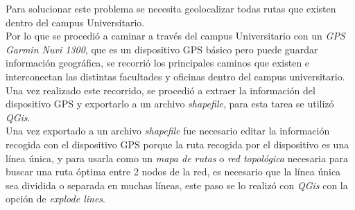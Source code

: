 Para solucionar este problema se necesita geolocalizar todas rutas que existen dentro del campus Universitario. \\


%
%


Por lo que se procedió a caminar a través del campus Universitario con un \emph{GPS Garmin Nuvi 1300}, que es un dispositivo GPS básico pero puede guardar información geográfica,  se recorrió los principales caminos que existen e interconectan las distintas facultades y oficinas dentro del campus universitario. Una vez realizado este recorrido, se procedió a extraer la información del dispositivo GPS y exportarlo a un archivo \emph{shapefile}, para esta tarea se utilizó \emph{QGis}. \\


Una vez exportado a un archivo \emph{shapefile} fue necesario editar la información recogida con el dispositivo GPS porque la ruta recogida por el dispositivo es una línea única, y para usarla como un \emph{mapa de rutas} o \emph{red topológica} necesaria para buscar una ruta óptima entre 2 nodos de la red, es necesario que la línea única sea dividida o separada en muchas líneas, este paso se lo realizó con \emph{QGis} con la opción de \emph{explode lines}. \\


